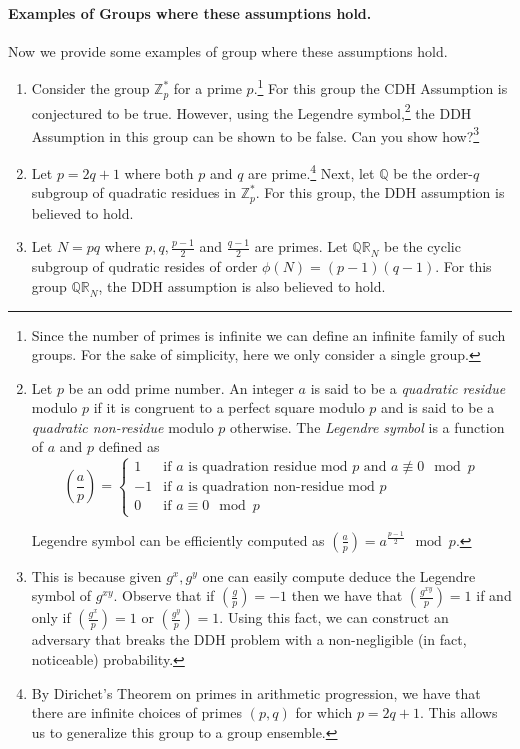 \paragraph{Examples of Groups where these assumptions hold.} Now we provide some examples of group where these assumptions hold. 
\begin{enumerate}
    \item Consider the group $\mathbb{Z}_p^*$ for a prime $p$.\footnote{Since the number of primes is infinite we can define an infinite family of such groups. For the sake of simplicity, here we only consider a single group.} For this group the CDH Assumption is conjectured to be true. However, using the Legendre symbol,\footnote{Let $p$ be an odd prime number. An integer $a$ is said to be a \emph{quadratic residue} modulo $p$ if it is congruent to a perfect square modulo $p$ and  is said to be a \emph{quadratic non-residue} modulo $p$ otherwise. The \emph{Legendre symbol} is a function of $a$ and $p$ defined as
    \begin{equation*}
        \left(\frac{a}{p}\right) = \begin{cases}
    1 &\text{if $a$ is quadration residue mod $p $ and $a \not\equiv 0 \mod p$}\\
    -1 &\text{if $a$ is quadration non-residue mod $p $}\\
    0 &\text{if $a \equiv 0 \mod p $}
    \end{cases}
    \end{equation*}
    
Legendre symbol can be efficiently computed as $\left(\frac{a}{p}\right) = a^{\frac{p-1}{2}}\mod p$.} 
the DDH Assumption in this group can be shown to be false. Can you show how?\footnote{This is because given $g^x, g^y$ one can easily compute deduce the Legendre symbol of $g^{xy}$.  Observe that if $\left(\frac{g}{p}\right) = -1$ then we have that $\left(\frac{g^{xy}}{p}\right) = 1$ if and only if $ \left(\frac{g^x}{p}\right) =1 $ or $\left(\frac{g^y}{p}\right) = 1$. Using this fact, we can construct an adversary that breaks the DDH problem with a non-negligible (in fact, noticeable) probability.}
\item Let $p = 2q+1$ where both $p$ and $q$ are prime.\footnote{By Dirichet's Theorem on primes in arithmetic progression, we have that there are infinite choices of primes $(p,q)$ for which $p = 2q+1$. This allows us to generalize this group to a group ensemble.} Next, let $\mathbb{Q}$ be the order-$q$ subgroup of quadratic residues in $\mathbb{Z}^*_p$. For this group, the DDH assumption is believed to hold. 
\item Let $N = pq$ where $p,q, \frac{p-1}{2}$ and $\frac{q-1}{2}$ are primes. Let $\mathbb{QR}_N$ be the cyclic subgroup of qudratic resides of order $\phi(N) = (p-1)(q-1)$. For this group $\mathbb{QR}_N$, the DDH assumption is also believed to hold.
\end{enumerate}

